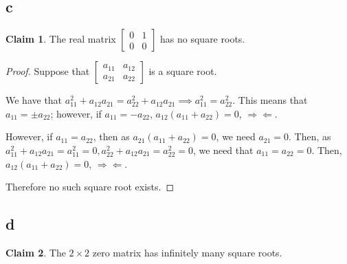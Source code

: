 \documentclass[12pt,letterpaper]{article}
\theoremstyle{definition}
\newtheorem*{claim}{Claim}
\newcommand{\contra}{\Rightarrow\!\Leftarrow}
\begin{document}
\subsection*{c}

\begin{claim}
  The real matrix $
  \begin{bmatrix}
    0 & 1 \\
    0 & 0
  \end{bmatrix}
  $ has no square roots.
\end{claim}

\begin{proof}
  Suppose that $\begin{bmatrix} a_{11} & a_{12} \\ a_{21} & a_{22}\end{bmatrix}$
  is a square root.

  We have that $a_{11}^2 + a_{12}a_{21} = a_{22}^2 + a_{12}a_{21} \implies
  a_{11}^2 = a_{22}^2$. This means that $a_{11} = \pm a_{22}$; however, if
  $a_{11} = -a_{22}$, $a_{12}(a_{11} + a_{22}) = 0$, $\contra$.

  However, if $a_{11} = a_{22}$, then as $a_{21}(a_{11} + a_{22}) = 0$, we need
  $a_{21} = 0$. Then, as $a_{11}^2 + a_{12}a_{21} = a_{11}^2 = 0, a_{22}^2 +
  a_{12}a_{21} = a_{22}^2 = 0$, we need that $a_{11} = a_{22} = 0$. Then,
  $a_{12}(a_{11} + a_{22}) = 0$, $\contra$.

  Therefore no such square root exists.
\end{proof}

\subsection*{d}

\begin{claim}
  The $2 \times 2$ zero matrix has infinitely many square roots.
\end{claim}
\end{document}
